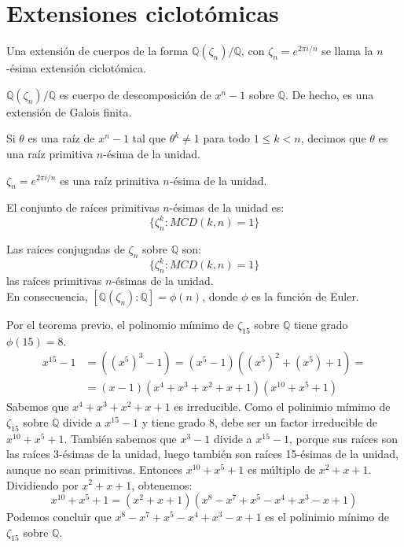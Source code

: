 \chapter{Extensiones ciclotómicas}

\begin{definition}
    Una extensión de cuerpos de la forma $\mathbb{Q}(\zeta_n)/\mathbb{Q}$, con $\zeta_n = e^{2\pi i/n}$ se llama la $n$-ésima extensión ciclotómica.
\end{definition}

\begin{proposition}
    $\mathbb{Q}(\zeta_n)/\mathbb{Q}$ es cuerpo de descomposición de $x^n-1$ sobre $\mathbb{Q}$. De hecho, es una extensión de Galois finita.
\end{proposition}

\begin{definition}
    Si $\theta$ es una raíz de $x^n-1$ tal que $\theta^k \neq 1$ para todo $1 \leq k < n$, decimos que $\theta$ es una raíz primitiva $n$-ésima de la unidad.
\end{definition}

\begin{remark}
    $\zeta_n = e^{2\pi i/n}$ es una raíz primitiva $n$-ésima de la unidad.
\end{remark}

\begin{proposition}
    El conjunto de raíces primitivas $n$-ésimas de la unidad es:
    $$\{ \zeta^k_n : MCD(k, n) = 1 \}$$
\end{proposition}

\begin{theorem}
    Las raíces conjugadas de $\zeta_n$ sobre $\mathbb{Q}$ son:
    $$\{ \zeta^k_n : MCD(k, n) = 1 \}$$
    las raíces primitivas $n$-ésimas de la unidad.\\
    En consecuencia, $[\mathbb{Q}(\zeta_n) : \mathbb{Q}] = \phi(n)$, donde $\phi$ es la función de Euler.
\end{theorem}

\begin{example}
    Por el teorema previo, el polinomio mímimo de $\zeta_{15}$ sobre $\mathbb{Q}$ tiene grado $\phi(15) = 8$.
    \begin{align*}
        x^{15}-1 & = ((x^5)^3-1) = (x^5-1)((x^5)^2+(x^5)+1) = \\
                 & = (x-1)(x^4+x^3+x^2+x+1)(x^{10}+x^5+1)
    \end{align*}
    Sabemos que $x^4+x^3+x^2+x+1$ es irreducible.
    Como el polinimio mímimo de $\zeta_{15}$ sobre $\mathbb{Q}$ divide a $x^{15}-1$ y tiene grado 8, debe ser un factor irreducible de $x^{10}+x^5+1$.
    También sabemos que $x^3-1$ divide a $x^15-1$, porque sus raíces son las raíces 3-ésimas de la unidad, luego también son raíces 15-ésimas de la unidad, aunque no sean primitivas.
    Entonces $x^{10}+x^5+1$ es múltiplo de $x^2+x+1$. Dividiendo por $x^2+x+1$, obtenemos:
    $$x^{10}+x^5+1 = (x^2+x+1)(x^8-x^7+x^5-x^4+x^3-x+1)$$
    Podemos concluir que $x^8-x^7+x^5-x^4+x^3-x+1$ es el polinimio mínimo de $\zeta_{15}$ sobre $\mathbb{Q}$.
\end{example}

